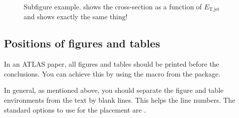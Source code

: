 \begin{figure}[htbp]
  \centering
  \caption{Subfigure example.
    \protect{} shows the cross-section as a function of $E_{\text{T,jet}}$ and 
    \protect{} shows exactly the same thing!}
  \label{fig:subfigexample}
\end{figure}


\subsection{Positions of figures and tables}

In an ATLAS paper, all figures and tables should be printed before the conclusions.
You can achieve this by using the macro  from the
 package.

In general, as mentioned above, you should separate the figure and table environments from the text by blank lines.
This helps the line numbers. The standard options to use for the placement are \Option{[htbp]}.


